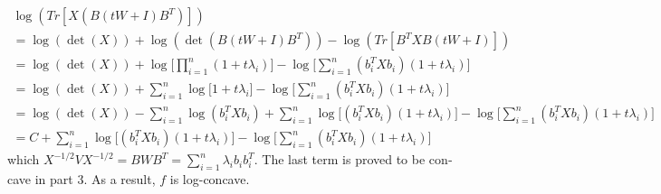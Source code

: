 \begin{latin}
\begin{enumerate}
\begin{gather*}
		\log(Tr[X(B (tW+I) B^{T})]) 
		\\
		= \log(\det(X)) + \log(\det(B (tW+I) B^{T})) -
		\log(Tr[B^{T} XB (tW+I)]) 
		\\
		= \log(\det(X)) + \log \big[\prod_{i=1}^{n} (1 + t \lambda_{i})\big] - \log \big[\sum_{i=1}^{n} (b_{i}^{T} X b_{i}) (1+t \lambda_{i}) \big] 
		\\
		= \log(\det(X)) + \sum_{i=1}^{n} \log \big[1 + t \lambda_{i}\big] -  \log \big[\sum_{i=1}^{n} (b_{i}^{T} X b_{i}) (1+t \lambda_{i}) \big] 
		\\
		= \log(\det(X)) - \sum_{i=1}^{n} \log (b_{i}^{T} X b_{i}) + \sum_{i=1}^{n}  \log \big[ (b_{i}^{T} X b_{i}) (1+t \lambda_{i}) \big] -  \log \big[\sum_{i=1}^{n} (b_{i}^{T} X b_{i}) (1+t \lambda_{i}) \big] 
		\\
		= C + \sum_{i=1}^{n}  \log \big[ (b_{i}^{T} X b_{i}) (1+t \lambda_{i}) \big] -  \log \big[\sum_{i=1}^{n} (b_{i}^{T} X b_{i}) (1+t \lambda_{i}) \big]
	\end{gather*}
	which $ X^{-1/2}VX^{-1/2} = B W B^{T} = \sum_{i=1}^{n} \lambda_{i} b_{i} b_{i}^{T}$. The last term is proved to be concave in part 3. As a result, $ f $ is log-concave.
\end{enumerate}
\end{latin}